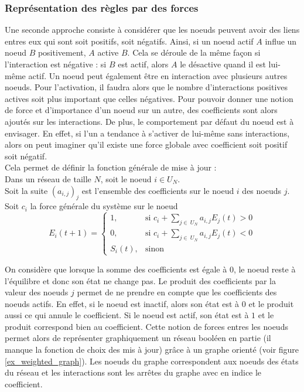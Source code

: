 \documentclass[11pt, a4paper]{article}
\begin{document}
\subsubsection{Représentation des règles par des forces}
Une seconde approche consiste à considérer que les noeuds peuvent avoir des
liens entres eux qui sont soit positifs, soit négatifs. Ainsi, si un noeud
actif $A$ influe un noeud $B$ positivement, $A$ active
$B$. Cela se déroule de la même façon si l'interaction est négative : si $B$
est actif, alors $A$ le désactive quand il est lui-même actif.  Un noeud peut
également être en interaction avec plusieurs autres noeuds.  Pour l'activation,
il faudra alors que le nombre d'interactions positives actives soit plus
important que celles négatives. Pour pouvoir donner une notion de force et
d'importance d'un noeud sur un autre, des coefficients sont alors ajoutés sur
les interactions. De plus, le comportement par défaut du noeud est à envisager.
En effet, si l'un a tendance à s'activer de lui-même sans interactions, alors
on peut imaginer qu'il existe une force globale avec coefficient soit positif
soit négatif. \\

Cela permet de définir la fonction générale de mise à jour : \\
Dans un réseau de taille $N$, soit le noeud $i \in U_N$. \\
Soit la suite $(a_{i,j})_j$ est l'ensemble des coefficients sur le noeud $i$
des noeuds $j$. \\
Soit $c_i$ la force générale du système sur le noeud
\begin{equation} \label{func_maj_weight}
    E_i(t + 1) = \left\{\begin{array}{rl}
            1, & \mbox{si } c_i + \sum_{j\in\ U_N} a_{i, j} E_j(t) > 0 \\
            0, & \mbox{si } c_i + \sum_{j\in\ U_N} a_{i, j} E_j(t) < 0 \\
            S_i(t), & \mbox{sinon}
    \end{array}\right.
\end{equation}

On considère que lorsque la somme des coefficients est égale à $0$, le noeud
reste à l'équilibre et donc son état ne change pas.  Le produit des
coefficients par la valeur des noeuds $j$ permet de ne prendre en compte que
les coefficients des noeuds actifs.  En effet, si le noeud est inactif, alors
son état est à $0$ et le produit aussi ce qui annule le coefficient.  Si le
noeud est actif, son état est à $1$ et le produit correspond bien au
coefficient. Cette notion de forces entres les noeuds permet alors de
représenter graphiquement un réseau booléen en partie (il manque la fonction de
choix des mis à jour) grâce à un graphe orienté (voir figure
\ref{ex_weighted_graph}).  Les noeuds du graphe correspondent aux noeuds des
états du réseau et les interactions sont les arrêtes du graphe avec en indice
le coefficient.
\end{document}
